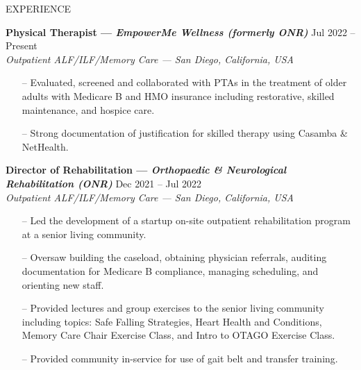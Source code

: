 \documentclass{resume} %
\begin{document}
\begin{rSection}{EXPERIENCE}

\textbf{Physical Therapist --- \textit{EmpowerMe Wellness (formerly ONR)}} \hfill Jul 2022 -- Present\\
\textit{Outpatient ALF/ILF/Memory Care --- San Diego, California, USA}
\vspace*{-0.2cm}\begin{itemize}
    \item[--] Evaluated, screened and collaborated with PTAs in the treatment of older adults with Medicare B and HMO insurance including restorative, skilled maintenance, and hospice care.
    \item[--]Strong documentation of justification for skilled therapy using Casamba \& NetHealth. 
\end{itemize}


\textbf{Director of Rehabilitation --- \textit{Orthopaedic \& Neurological Rehabilitation (ONR)}} \hfill Dec 2021 -- Jul 2022\\
\textit{Outpatient ALF/ILF/Memory Care --- San Diego, California, USA}
\vspace*{-0.2cm}\begin{itemize}
    \item[--] Led the development of a startup on-site outpatient rehabilitation program at a senior living community.
    \item[--]Oversaw building the caseload, obtaining physician referrals, auditing documentation for Medicare B compliance, managing scheduling, and orienting new staff.
    \item [--] Provided lectures and group exercises to the senior living community including topics: Safe Falling Strategies, Heart Health and Conditions, Memory Care Chair Exercise Class, and Intro to OTAGO Exercise Class.
    \item [--] Provided community in-service for use of gait belt and transfer training.
\end{itemize}


\end{rSection}
\end{document}
